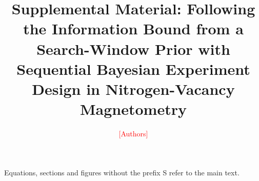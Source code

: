 \documentclass[aps,prapplied,reprint,superscriptaddress,nofootinbib,floatfix]{revtex4-2}
\newcommand{\tbd}[1]{\textcolor{red}{[#1]}}
\begin{document}
\title{Supplemental Material: Following the Information Bound from a Search-Window Prior with Sequential Bayesian
Experiment Design in Nitrogen-Vacancy Magnetometry}

\author{\tbd{Authors}}
\affiliation{\tbd{Affiliation}}

\maketitle

Equations, sections and figures without the prefix S refer to the main text.















\end{document}
